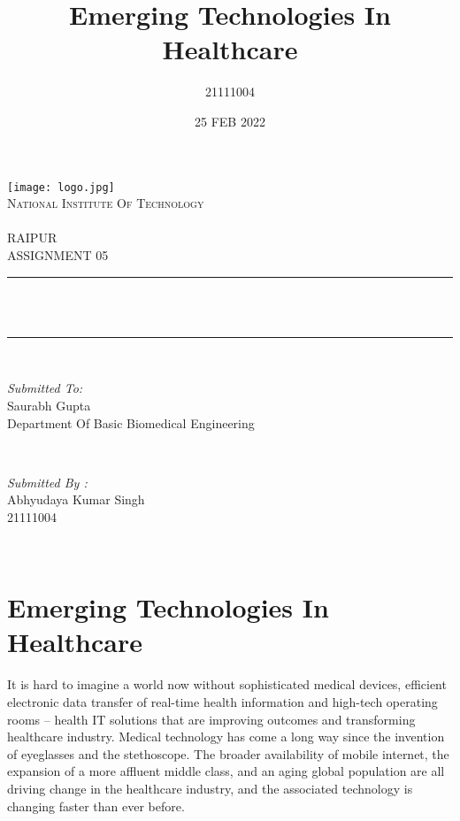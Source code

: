 \documentclass[12pt]{article}
\title{Emerging Technologies In Healthcare}
\author{21111004}
\date{25 FEB 2022}
\makeatletter
\let\thetitle\@title
\makeatother
\begin{document}
\begin{titlepage}
	\centering
    \texttt{[image: logo.jpg]}\\[1.0 cm]	
    \textsc{\LARGE National Institute Of Technology \newline\\\\ RAIPUR}\\[2.0 CM]
    
	\textsc{\Large ASSIGNMENT 05}\\[0.5 cm]				%
	\rule{\linewidth}{0.4 mm} \\[0.4 cm]
	{ \huge \bfseries \thetitle}\\
	\rule{\linewidth}{0.4 mm} \\[1.5 cm]
	
	\begin{minipage}{0.6\textwidth}
		\begin{flushleft} \large
			\emph{Submitted To:}\\
			Saurabh Gupta\\
            Department Of Basic Biomedical Engineering\\
			\end{flushleft}
			\end{minipage}~
			\begin{minipage}{0.4\textwidth}
            
			\begin{flushright} \large
			\emph{Submitted By :}\\
			Abhyudaya Kumar Singh\\
            21111004\\
		\end{flushright}
        
	\end{minipage}\\[2 cm]
\end{titlepage}

\tableofcontents
\pagebreak

\section{Emerging Technologies In Healthcare}
It is hard to imagine a world now without sophisticated medical devices, efficient electronic data transfer of real-time health information and high-tech operating rooms – health IT solutions that are improving outcomes and transforming healthcare industry.
Medical technology has come a long way since the invention of eyeglasses and the stethoscope. The broader availability of mobile internet, the expansion of a more affluent middle class, and an aging global population are all driving change in the healthcare industry, and the associated technology is changing faster than ever before.
\end{document}
